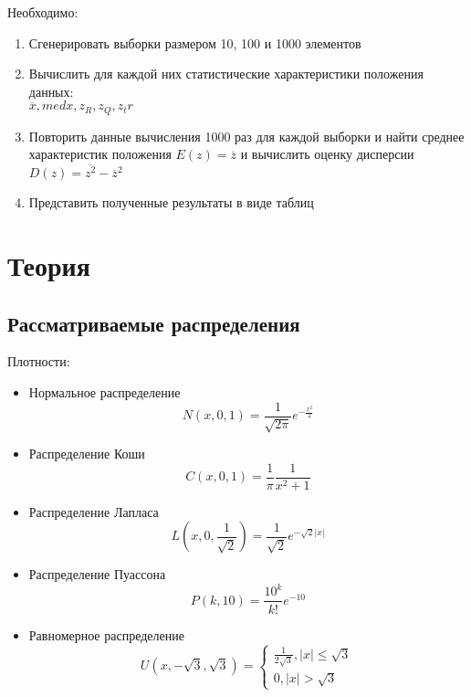 \documentclass[12pt,a4paper]{article}
\begin{document}
Необходимо:
\begin{enumerate}
    \item Сгенерировать выборки размером 10, 100 и 1000 элементов
    \item Вычислить для каждой них статистические характеристики положения данных: \\ $\overline{x}, med x, z_R, z_Q, z_tr$
    \item Повторить данные вычисления 1000 раз для каждой выборки и найти среднее характеристик положения $E(z)=\overline{z}$ и вычислить оценку дисперсии $D(z)=\overline{z^2}-{\overline{z}}^2$
    \item Представить полученные результаты в виде таблиц
\end{enumerate}

\section{Теория}
\subsection{Рассматриваемые распределения}
Плотности:
\begin{itemize}
		\item Нормальное распределение
		    \begin{equation}
			    N(x,0,1)=\frac{1}{\sqrt{2\pi}}e^{-\frac{x^2}{2}}
			    \label{normal} 
			\end{equation}
		\item Распределение Коши
		    \begin{equation}
				C(x,0,1)=\frac{1}{\pi}\frac{1}{x^2+1}
				\label{cauchy}
			\end{equation} 
		\item Распределение Лапласа
		    \begin{equation}
				L(x,0,\frac{1}{\sqrt{2}})=\frac{1}{\sqrt{2}}e^{-\sqrt{2}|x|}
				\label{laplace} 
			\end{equation}
		\item Распределение Пуассона
		    \begin{equation}
				P(k,10)=\frac{10^k}{k!}e^{-10}
				\label{poisson}
			\end{equation}
		\item Равномерное распределение
		    \begin{equation}
				U(x,-\sqrt{3},\sqrt{3})=
				\begin{cases}
					\frac{1}{2\sqrt{3}},|x|\leq\sqrt{3}\\0,|x|>\sqrt{3}
				\end{cases}
				\label{uniform}
			\end{equation}
\end{itemize}
\end{document}

